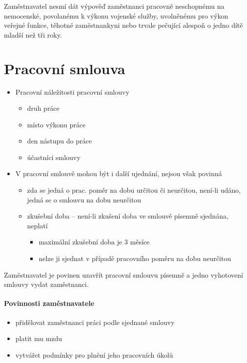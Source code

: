 \documentclass[11pt,a4paper,twoside]{book}
\begin{document}
	Zaměstnavatel nesmí dát výpověď zaměstnanci pracovně neschopnému na nemocenské, povolanému k výkonu vojenské služby, uvolněnému pro výkon veřejné funkce, těhotné 	zaměstnankyni nebo trvale pečující alespoň o jedno dítě mladší než tři roky.

	\section*{Pracovní smlouva}
	\begin{itemize}
		\item Pracovní náležitosti pracovní smlouvy
			\begin{itemize}
				\item druh práce
				\item místo výkonu práce
				\item den nástupu do práce
				\item účastníci smlouvy
			\end{itemize}
		\item V pracovní smlouvě mohou být i další ujednání, nejsou však povinná
			\begin{itemize}
				\item zda se jedná o prac. poměr na dobu určitou či neurčitou, není-li udáno, jedná se o smlouvu na dobu neurčitou
				\item zkušební doba -- není-li zkušení doba ve smlouvě písemně sjednána, neplatí
					\begin{itemize}
						\item maximální zkušební doba je 3 měsíce
						\item nelze ji sjednat v případě pracovního poměru na dobu neurčitou
					\end{itemize}			
			\end{itemize}
	\end{itemize}

	Zaměstnavatel je povinen uzavřít pracovní smlouvu písemně a jedno vyhotovení smlouvy vydat zaměstnanci.

	\paragraph*{Povinnosti zaměstnavatele}
	\begin{itemize}
		\item přidělovat zaměstnanci práci podle sjednané smlouvy
		\item platit mu mzdu
		\item vytvářet podmínky pro plnění jeho pracovních úkolů
	\end{itemize}
\end{document}
